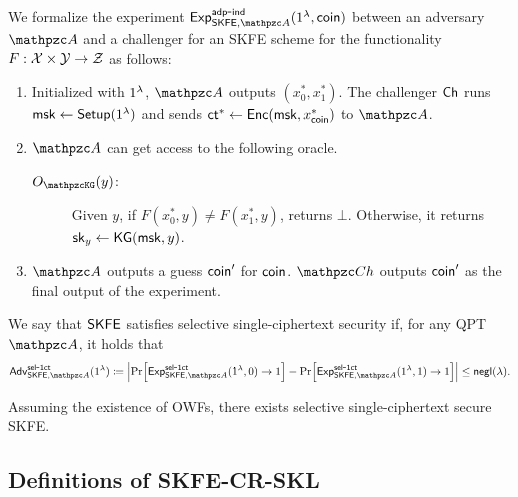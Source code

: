 \begin{definition}\label{def:sel-1ct-SKFE}
We formalize the experiment
$\expb{\SKFE,\qA}{adp}{ind}(1^\secp,\coin)$ between an adversary
$\qA$ and a challenger for an SKFE scheme for the functionality $F:\mathcal{X}\times\mathcal{Y}\rightarrow\mathcal{Z}$ as follows:
        \begin{enumerate}
            \item Initialized with $1^\lambda$, $\qA$ outputs $(x_0^*,x_1^*)$. The challenger $\mathsf{Ch}$ runs $\mathsf{msk}\leftarrow\mathsf{Setup}(1^\lambda)$ and sends $\mathsf{ct}^*\leftarrow\mathsf{Enc}(\mathsf{msk},x_{\mathsf{coin}}^*)$ to $\qA$.
            \item $\qA$ can get access to the following oracle.
            \begin{description}
            \item[$\Oracle{\qKG}(y)$:] Given $y$, if $F(x_0^*,y)\ne F(x_1^*,y)$, returns $\bot$. Otherwise, it returns $\mathsf{sk}_y\leftarrow\mathsf{KG}(\mathsf{msk},y)$.
            \end{description}
            \item $\qA$ outputs a guess $\mathsf{coin}^\prime$ for $\mathsf{coin}$. 
            $\qCh$ outputs $\mathsf{coin}'$ as the final output of the experiment.
        \end{enumerate}
        
We say that $\mathsf{SKFE}$ satisfies selective single-ciphertext security if, for any QPT $\qA$, it holds that
\begin{align}
\advb{\SKFE,\qA}{sel}{1ct}(1^\secp) \seteq \abs{\Pr[\expb{\SKFE,\qA}{sel}{1ct} (1^\secp,0) \ra 1] - \Pr[\expb{\SKFE,\qA}{sel}{1ct} (1^\secp,1) \ra 1] }\le \negl(\secp).
\end{align}
\end{definition}

\begin{theorem}\label{thm:1ct_adaptive_function_private_SKFE}
    Assuming the existence of OWFs, there exists selective single-ciphertext secure SKFE.
\end{theorem}


\subsection{Definitions of SKFE-CR-SKL}

